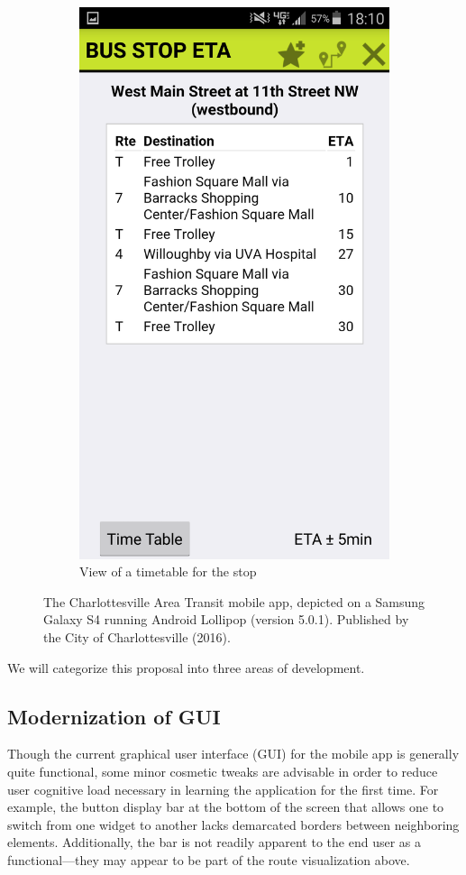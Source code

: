 \documentclass[12pt,letterpaper]{article}
\begin{document}
\begin{figure}[ph!]
\begin{subfigure}{.5\textwidth}
  \includegraphics[width=.9\linewidth]{CAT_mobile_2}
  \caption{View of a timetable for the stop}
  \label{fig:cat_mobile_2}
\end{subfigure}
\caption{The Charlottesville Area Transit mobile app, depicted on a Samsung
    Galaxy S4 running Android Lollipop (version 5.0.1). Published by the City of Charlottesville (2016).}
\label{fig:cat_mobile}
\end{figure}

We will categorize this proposal into three areas of development.

\subsection{Modernization of GUI}
Though the current graphical user interface (GUI) for the mobile app is
generally quite functional, some minor cosmetic tweaks are advisable in order
to reduce user cognitive load necessary in learning the application for the
first time. For example, the button display bar at the bottom of the screen
that allows one to switch from one widget to another lacks demarcated borders
between neighboring elements. Additionally, the bar is not readily apparent to
the end user as a functional---they may appear to be part of the route
visualization above.
\end{document}
